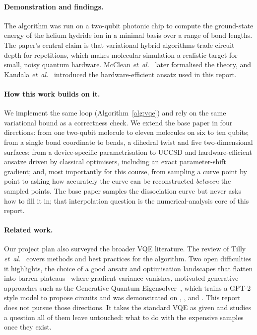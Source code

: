 \documentclass[sigconf,screen,nonacm]{acmart}
\begin{document}
\paragraph{Demonstration and findings.}
The algorithm was run on a two-qubit photonic chip to compute the
ground-state energy of the helium hydride ion  in a minimal basis
over a range of bond lengths. The paper's central claim is that variational
hybrid algorithms trade circuit depth for repetitions, which makes molecular
simulation a realistic target for small, noisy quantum hardware. McClean
\emph{et~al.}~\cite{mcclean2016} later formalised the theory, and Kandala
\emph{et~al.}~\cite{kandala2017} introduced the hardware-efficient ansatz
used in this report.

\paragraph{How this work builds on it.}
We implement the same loop (Algorithm~\ref{alg:vqe}) and rely on the same
variational bound as a correctness check. We extend the base paper in four
directions: from one two-qubit molecule to eleven molecules on six to ten
qubits; from a single bond coordinate to bends, a dihedral twist and five
two-dimensional surfaces; from a device-specific parametrisation to UCCSD and
hardware-efficient ansatze driven by classical optimisers, including an exact
parameter-shift gradient; and, most importantly for this course, from
sampling a curve point by point to asking how accurately the curve can be
reconstructed \emph{between} the sampled points. The base paper samples the
dissociation curve but never asks how to fill it in; that interpolation
question is the numerical-analysis core of this report.

\paragraph{Related work.}
Our project plan also surveyed the broader VQE literature. The review of
Tilly \emph{et~al.}~\cite{tilly2022} covers methods and best practices for the
algorithm. Two open difficulties it highlights, the choice of a good ansatz
and optimisation landscapes that flatten into barren
plateaus~\cite{larocca2024bp} where gradient variance vanishes, motivated
generative approaches such as the Generative Quantum
Eigensolver~\cite{nakaji2024gqe}, which trains a GPT-2 style model to propose
circuits and was demonstrated on , ,  and .
This report does not pursue those directions. It takes the standard VQE as
given and studies a question all of them leave untouched: what to do with the
expensive samples once they exist.
\end{document}
